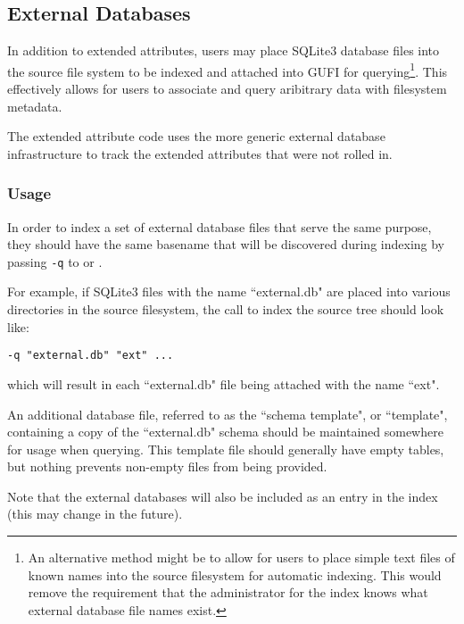 \subsection{External Databases}
In addition to extended attributes, users may place SQLite3 database
files into the source file system to be indexed and attached into GUFI
for querying\footnote{An alternative method might be to allow for
users to place simple text files of known names into the source
filesystem for automatic indexing. This would remove the requirement
that the administrator for the index knows what external database file
names exist.}. This effectively allows for users to associate and
query aribitrary data with filesystem metadata.

The extended attribute code uses the more generic external database
infrastructure to track the extended attributes that were not rolled
in.

\subsubsection{Usage}
In order to index a set of external database files that serve the same
purpose, they should have the same basename that will be discovered
during indexing by passing \texttt{-q} to \gufidirindex or
\gufidirtrace.

For example, if SQLite3 files with the name ``external.db" are placed
into various directories in the source filesystem, the call to index
the source tree should look like:

\hspace*{\fill} \gufidirindex \texttt{-q "external.db" "ext" ...} \hspace*{\fill}

which will result in each ``external.db" file being attached with the
name ``ext".

An additional database file, referred to as the ``schema template", or
``template", containing a copy of the ``external.db" schema should be
maintained somewhere for usage when querying. This template file
should generally have empty tables, but nothing prevents non-empty
files from being provided.

Note that the external databases will also be included as an entry in
the index (this may change in the future).
